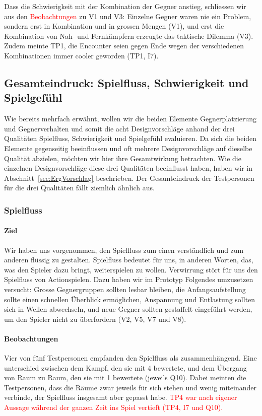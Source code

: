 \documentclass[../Main.tex]{subfiles}
\begin{document}
Dass die Schwierigkeit mit der Kombination der Gegner anstieg, schliessen wir aus den \textcolor{red}{Beobachtungen} zu V1 und V3: Einzelne Gegner waren nie ein Problem, sondern erst in Kombination und in grossen Mengen (V1), und erst die Kombination von Nah- und Fernkämpfern erzeugte das taktische Dilemma (V3). Zudem meinte TP1, die Encounter seien gegen Ende wegen der verschiedenen Kombinationen immer cooler geworden (TP1, I7).

\subsection{Gesamteindruck: Spielfluss, Schwierigkeit und Spielgefühl} \label{sec:Gesamteindruck} \label{sec:ErgAllgemein}

Wie bereits mehrfach erwähnt, wollen wir die beiden Elemente Gegnerplatzierung und Gegnerverhalten und somit die acht Designvorschläge anhand der drei Qualitäten Spielfluss, Schwierigkeit und Spielgefühl evaluieren. Da sich die beiden Elemente gegenseitig beeinflussen und oft mehrere Designvorschläge auf dieselbe Qualität abzielen, möchten wir hier ihre Gesamtwirkung betrachten. Wie die einzelnen Designvorschläge diese drei Qualitäten beeinflusst haben, haben wir in Abschnitt~\ref{sec:ErgVorschlag} beschrieben. Der Gesamteindruck der Testpersonen für die drei Qualitäten fällt ziemlich ähnlich aus.

\subsubsection{Spielfluss}

\paragraph{Ziel}
Wir haben uns vorgenommen, den Spielfluss zum einen verständlich und zum anderen flüssig zu gestalten. Spielfluss bedeutet für uns, in anderen Worten, das, was den Spieler dazu bringt, weiterspielen zu wollen. Verwirrung stört für uns den Spielfluss von Actionspielen. Dazu haben wir im Prototyp Folgendes umzusetzen versucht: Grosse Gegnergruppen sollten lesbar bleiben, die Anfangsaufstellung sollte einen schnellen Überblick ermöglichen, Anspannung und Entlastung sollten sich in Wellen abwechseln, und neue Gegner sollten gestaffelt eingeführt werden, um den Spieler nicht zu überfordern (V2, V5, V7 und V8).

\paragraph{Beobachtungen}
Vier von fünf Testpersonen empfanden den Spielfluss als zusammenhängend. Eine unterschied zwischen dem Kampf, den sie mit 4 bewertete, und dem Übergang von Raum zu Raum, den sie mit 1 bewertete (jeweils Q10). Dabei meinten die Testpersonen, dass die Räume zwar jeweils für sich stehen und wenig miteinander verbinde, der Spielfluss insgesamt aber gepasst habe. \textcolor{red}{TP4 war nach eigener Aussage während der ganzen Zeit ins Spiel vertieft (TP4, I7 und Q10).}
\end{document}
